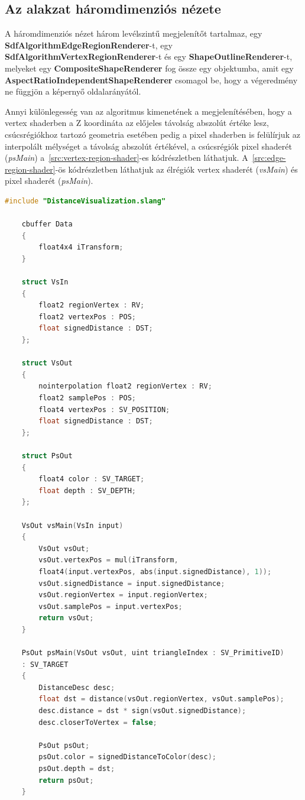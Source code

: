 \subsection{Az alakzat háromdimenziós nézete}

A háromdimenziós nézet három levélszintű megjelenítőt tartalmaz, egy \textbf{SdfAlgorithmEdgeRegionRenderer}-t, egy \textbf{SdfAlgorithmVertexRegionRenderer}-t és egy \textbf{ShapeOutlineRenderer}-t, melyeket egy \textbf{CompositeShapeRenderer} fog össze egy objektumba, amit egy \textbf{AspectRatioIndependentShapeRenderer} csomagol be, hogy a végeredmény ne függjön a képernyő oldalarányától.

Annyi különlegesség van az algoritmus kimenetének a megjelenítésében, hogy a vertex shaderben\cite{vertexshader} a Z koordináta az előjeles távolság abszolút értéke lesz, csúcsrégiókhoz tartozó geometria esetében pedig a pixel shaderben is felülírjuk az interpolált mélységet a távolság abszolút értékével, a csúcsrégiók pixel shaderét\cite{pixelshader} (\textit{psMain}) a~\ref{src:vertex-region-shader}-es kódrészletben láthatjuk. A~\ref{src:edge-region-shader}-ös kódrészletben láthatjuk az élrégiók vertex shaderét (\textit{vsMain}) és pixel shaderét (\textit{psMain}).

\begin{lstlisting}[language=c]
	#include "DistanceVisualization.slang"

	cbuffer Data
	{
		float4x4 iTransform;
	}

	struct VsIn
	{
		float2 regionVertex : RV;
		float2 vertexPos : POS;
		float signedDistance : DST;
	};

	struct VsOut
	{
		nointerpolation float2 regionVertex : RV;
		float2 samplePos : POS;
		float4 vertexPos : SV_POSITION;
		float signedDistance : DST;
	};

	struct PsOut
	{
		float4 color : SV_TARGET;
		float depth : SV_DEPTH;
	};

	VsOut vsMain(VsIn input)
	{
		VsOut vsOut;
		vsOut.vertexPos = mul(iTransform,
		float4(input.vertexPos, abs(input.signedDistance), 1));
		vsOut.signedDistance = input.signedDistance;
		vsOut.regionVertex = input.regionVertex;
		vsOut.samplePos = input.vertexPos;
		return vsOut;
	}

	PsOut psMain(VsOut vsOut, uint triangleIndex : SV_PrimitiveID)
	: SV_TARGET
	{
		DistanceDesc desc;
		float dst = distance(vsOut.regionVertex, vsOut.samplePos);
		desc.distance = dst * sign(vsOut.signedDistance);
		desc.closerToVertex = false;

		PsOut psOut;
		psOut.color = signedDistanceToColor(desc);
		psOut.depth = dst;
		return psOut;
	}
\end{lstlisting}


